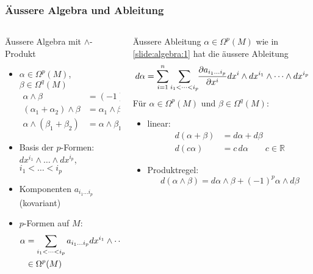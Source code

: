 %
%
%
\bgroup
\begin{frame}[t]
\setlength{\abovedisplayskip}{5pt}
\setlength{\belowdisplayskip}{5pt}
\frametitle{Äussere Algebra und Ableitung}
\vspace{-20pt}
\begin{columns}[t,onlytextwidth]
\begin{column}{0.48\textwidth}
\begin{block}{Äussere Algebra mit $\wedge$-Produkt}
\begin{itemize}
\item $\alpha\in\Omega^p(M)$, $\beta\in\Omega^q(M)$
\begin{align*}
\alpha\wedge \beta &= (-1)^{pq}\beta\wedge\alpha
\\
(\alpha_1+\alpha_2)\wedge\beta &= \alpha_1\wedge \beta + \alpha_2\wedge\beta
\\
\alpha\wedge(\beta_1+\beta_2) &= \alpha\wedge\beta_1 + \alpha\wedge\beta_2
\end{align*}
\item 
Basis der $p$-Formen:
$dx^{i_1}\wedge\dots\wedge dx^{i_p}$,
$i_1<\dots <i_p$
\item
Komponenten $a_{i_1\dots i_p}$ (kovariant)
\item $p$-Formen auf $M$:
\begin{align}
\alpha
&=
\sum_{i_1<\dots<i_p}
a_{i_1\dots i_p} dx^{i_1}\wedge\dots\wedge dx^{i_p}
\label{slide:algebra:1}
\\
&\in \Omega^p (M)
\notag
\end{align}
\end{itemize}
\end{block}
\end{column}
\begin{column}{0.48\textwidth}
\begin{block}{Äussere Ableitung}
$\alpha\in\Omega^p(M)$ wie in \eqref{slide:algebra:1}
hat die äussere Ableitung
\[
d\alpha
=
\sum_{i=1}^n
\sum_{i_1<\dots<i_p}
\hspace*{-3pt}
\frac{\partial a_{i_1\dots i_p}}{\partial x^i} dx^i \wedge  dx^{i_1}\wedge\dots\wedge dx^{i_p}
\]
Für $\alpha\in\Omega^p(M)$ und $\beta\in\Omega^q(M)$:
\begin{itemize}
\item linear:
\begin{align*}
d(\alpha+\beta)
&=
d\alpha + d\beta
\\
d(c\alpha) &= c\, d\alpha \qquad c\in\mathbb{R}
\end{align*}
\item Produktregel:
\[
d(\alpha\wedge\beta)
=
d\alpha \wedge \beta
+
(-1)^{p}
\alpha\wedge d\beta
\]
\end{itemize}
\end{block}
\end{column}
\end{columns}
\end{frame}
\egroup

